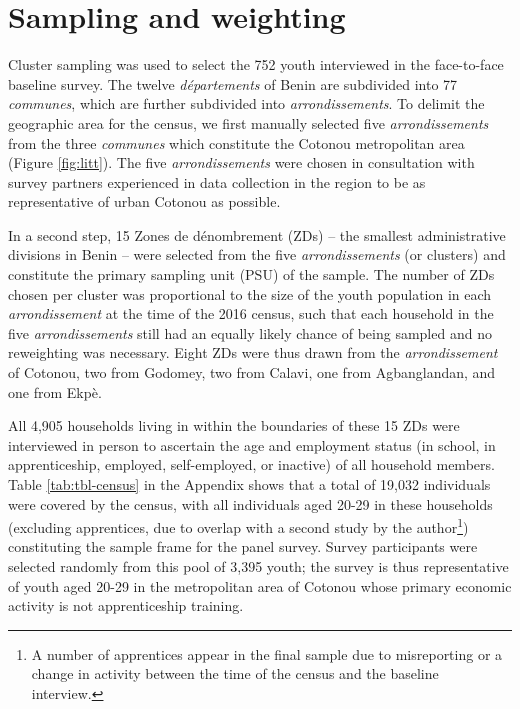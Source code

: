 \documentclass[
  11pt,
a4paper
]{article}
\begin{document}
\hypertarget{survey-weighting}{%
\section*{Sampling and weighting}\label{survey-weighting}}

Cluster sampling was used to select the 752 youth interviewed in the face-to-face baseline survey. The twelve \emph{départements} of Benin are subdivided into 77 \emph{communes}, which are further subdivided into \emph{arrondissements}. To delimit the geographic area for the census, we first manually selected five \emph{arrondissements} from the three \emph{communes} which constitute the Cotonou metropolitan area (Figure \ref{fig:litt}). The five \emph{arrondissements} were chosen in consultation with survey partners experienced in data collection in the region to be as representative of urban Cotonou as possible.

In a second step, 15 Zones de dénombrement (ZDs) -- the smallest administrative divisions in Benin -- were selected from the five \emph{arrondissements} (or clusters) and constitute the primary sampling unit (PSU) of the sample. The number of ZDs chosen per cluster was proportional to the size of the youth population in each \emph{arrondissement} at the time of the 2016 census, such that each household in the five \emph{arrondissements} still had an equally likely chance of being sampled and no reweighting was necessary. Eight ZDs were thus drawn from the \emph{arrondissement} of Cotonou, two from Godomey, two from Calavi, one from Agbanglandan, and one from Ekpè.

All 4,905 households living in within the boundaries of these 15 ZDs were interviewed in person to ascertain the age and employment status (in school, in apprenticeship, employed, self-employed, or inactive) of all household members. Table \ref{tab:tbl-census} in the Appendix shows that a total of 19,032 individuals were covered by the census, with all individuals aged 20-29 in these households (excluding apprentices, due to overlap with a second study by the author\footnote{A number of apprentices appear in the final sample due to misreporting or a change in activity between the time of the census and the baseline interview.}) constituting the sample frame for the panel survey. Survey participants were selected randomly from this pool of 3,395 youth; the survey is thus representative of youth aged 20-29 in the metropolitan area of Cotonou whose primary economic activity is not apprenticeship training.
\end{document}
